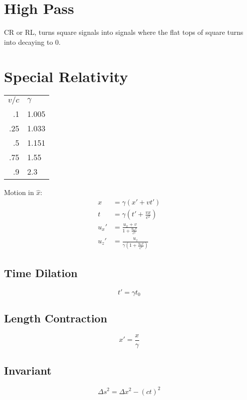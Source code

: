 \documentclass[10pt,letter]{article}
\begin{document}
\section{High Pass} %
\label{sec:high_pass}
CR or RL, turns square signals into signals where the flat tops of square turns into decaying to 0.

\section{Special Relativity} %
\label{sec:special_relativity}
\begin{tabular}{ r l}
$v/c$ & $\gamma$\\
.1 & 1.005\\
.25 & 1.033\\
.5 & 1.151\\
.75 & 1.55\\
.9 & 2.3
\end{tabular}
Motion in $\hat{x}$:
\begin{align}
    x &= \gamma (x' + vt')\\
    t &= \gamma \left( t' + \frac{vx}{c^2} \right)\\
    u_x' &= \frac{u_x + v}{1 + \frac{u_x v}{c^2}}\\
    u_z' &= \frac{u_z}{ \gamma \left( 1 + \frac{u_x v}{c^2} \right) }
\end{align}
\subsection{Time Dilation} %
\label{sub:time_dilation}
\begin{equation}
    t' = \gamma t_0
\end{equation}
\subsection{Length Contraction} %
\label{sub:length_contraction}
\begin{equation}
    x' = \frac{x}{\gamma}
\end{equation}
\subsection{Invariant} %
\label{sub:invariant}
\begin{equation}
    \Delta s^2 = \Delta x^2 - (ct)^2
\end{equation}
\end{document}
